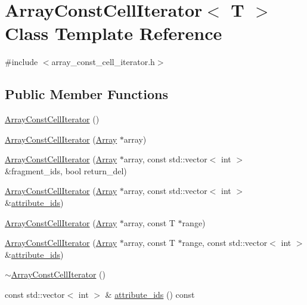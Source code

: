 \hypertarget{classArrayConstCellIterator}{}\section{Array\+Const\+Cell\+Iterator$<$ T $>$ Class Template Reference}
\label{classArrayConstCellIterator}


{\ttfamily \#include $<$array\+\_\+const\+\_\+cell\+\_\+iterator.\+h$>$}

\subsection*{Public Member Functions}
\begin{DoxyCompactItemize}
\item 
\hyperlink{classArrayConstCellIterator_ab9d1fe47130df37868a459110383060b}{Array\+Const\+Cell\+Iterator} ()
\item 
\hyperlink{classArrayConstCellIterator_ab24277226ceda5cc947d159305e3a83b}{Array\+Const\+Cell\+Iterator} (\hyperlink{classArray}{Array} $\ast$array)
\item 
\hyperlink{classArrayConstCellIterator_a71cb4a994a9ebace183be1e6604da7de}{Array\+Const\+Cell\+Iterator} (\hyperlink{classArray}{Array} $\ast$array, const std\+::vector$<$ int $>$ \&fragment\+\_\+ids, bool return\+\_\+del)
\item 
\hyperlink{classArrayConstCellIterator_a8fbd2c2a33302802b910e8f74517f005}{Array\+Const\+Cell\+Iterator} (\hyperlink{classArray}{Array} $\ast$array, const std\+::vector$<$ int $>$ \&\hyperlink{classArrayConstCellIterator_a91372f0ec644f90afa8b757822bd77f3}{attribute\+\_\+ids})
\item 
\hyperlink{classArrayConstCellIterator_ab45c4f2b5e1cf7b7cd359779f6aba74c}{Array\+Const\+Cell\+Iterator} (\hyperlink{classArray}{Array} $\ast$array, const T $\ast$range)
\item 
\hyperlink{classArrayConstCellIterator_ad35fc99fdc9a5867be8b0cc2a3e393df}{Array\+Const\+Cell\+Iterator} (\hyperlink{classArray}{Array} $\ast$array, const T $\ast$range, const std\+::vector$<$ int $>$ \&\hyperlink{classArrayConstCellIterator_a91372f0ec644f90afa8b757822bd77f3}{attribute\+\_\+ids})
\item 
\hyperlink{classArrayConstCellIterator_a7613826cf0836a1d4beb1c564e15af7f}{$\sim$\+Array\+Const\+Cell\+Iterator} ()
\item 
const std\+::vector$<$ int $>$ \& \hyperlink{classArrayConstCellIterator_a91372f0ec644f90afa8b757822bd77f3}{attribute\+\_\+ids} () const 

\end{DoxyCompactItemize}
